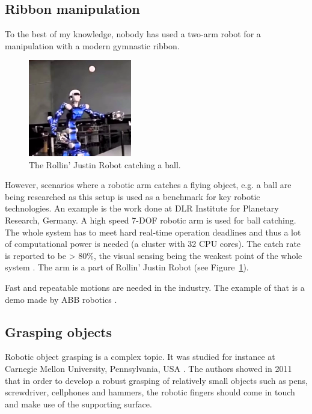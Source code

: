    \subsection{Ribbon manipulation}
        To the best of my knowledge, nobody has used a two-arm robot for a manipulation with a modern gymnastic ribbon.

        \begin{figure}[h]
        \includegraphics[width=0.4\textwidth]{Justine.png}
        \centering
        \caption{The Rollin' Justin Robot catching a ball.}
        \label{fig:Justine}
        \end{figure}

        However, scenarios where a robotic arm catches a flying object, e.g. a ball are being researched as this setup is used as a benchmark for key robotic technologies. An example is the work done at DLR Institute for Planetary Research, Germany. A high speed 7-DOF robotic arm is used for ball catching. The whole system has to meet hard real-time operation deadlines and thus a lot of computational power is needed (a cluster with 32 CPU cores). The catch rate is reported to be > 80\%, the visual sensing being the weakest point of the whole system \cite{FastBallCatching}. The arm is a part of Rollin' Justin Robot \cite{FastBallCatchingVideo} (see Figure~\ref{fig:Justine}).

        Fast and repeatable motions are needed in the industry. The example of that is a demo made by ABB robotics \cite{CanChallengeVideo}.

    \subsection{Grasping objects}
        Robotic object grasping is a complex topic. It was studied for instance at Carnegie Mellon University, Pennsylvania, USA \cite{kazemi2012robust}. The authors showed in 2011 that in order to develop a robust grasping of relatively small objects such as pens, screwdriver, cellphones and hammers, the robotic fingers should come in touch and make use of the supporting surface.

